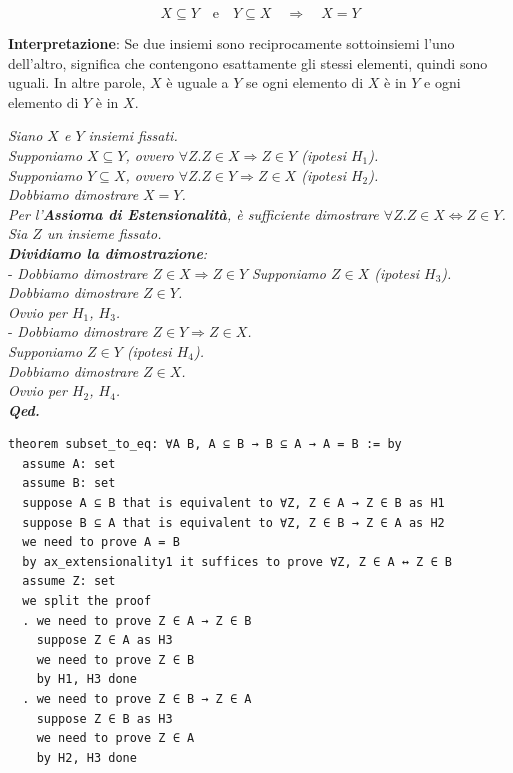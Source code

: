 \documentclass[
  a4paper,
]{article}
\begin{document}
\[
X \subseteq Y \quad \text{e} \quad Y \subseteq X \quad \Rightarrow \quad X = Y
\]

\textbf{Interpretazione}: Se due insiemi sono reciprocamente
sottoinsiemi l'uno dell'altro, significa che contengono esattamente gli
stessi elementi, quindi sono uguali. In altre parole, \(X\) è uguale a
\(Y\) se ogni elemento di \(X\) è in \(Y\) e ogni elemento di \(Y\) è in
\(X\).

\begin{examplebox}[Dimostrazione]

\emph{Siano \(X\) e \(Y\) insiemi fissati.}\\
\emph{Supponiamo \(X \subseteq Y\), ovvero
\(\forall Z.Z \in X \Rightarrow Z \in Y\) (ipotesi \(H_1\)).}\\
\emph{Supponiamo \(Y \subseteq X\), ovvero
\(\forall Z.Z \in Y \Rightarrow Z \in X\) (ipotesi \(H_2\)).}\\
\emph{Dobbiamo dimostrare \(X = Y\).}\\
\emph{Per l'\textbf{Assioma di Estensionalità}, è sufficiente dimostrare
\(\forall Z.Z \in X \iff Z \in Y\).}\\
\emph{Sia \(Z\) un insieme fissato.}\\
\emph{\textbf{Dividiamo la dimostrazione}:}\\
- \emph{Dobbiamo dimostrare \(Z \in X \Rightarrow Z \in Y\)}
\emph{Supponiamo \(Z \in X\) (ipotesi \(H_3\)).}\\
\emph{Dobbiamo dimostrare \(Z \in Y\).}\\
\emph{Ovvio per \(H_1\), \(H_3\).}\\
- \emph{Dobbiamo dimostrare \(Z \in Y \Rightarrow Z \in X\).}\\
\emph{Supponiamo \(Z \in Y\) (ipotesi \(H_4\)).}\\
\emph{Dobbiamo dimostrare \(Z \in X\).}\\
\emph{Ovvio per \(H_2\), \(H_4\).}\\
\textbf{\emph{Qed.}}

\end{examplebox}

\begin{examplebox}

\begin{lstlisting}
theorem subset_to_eq: ∀A B, A ⊆ B → B ⊆ A → A = B := by
  assume A: set
  assume B: set
  suppose A ⊆ B that is equivalent to ∀Z, Z ∈ A → Z ∈ B as H1
  suppose B ⊆ A that is equivalent to ∀Z, Z ∈ B → Z ∈ A as H2
  we need to prove A = B
  by ax_extensionality1 it suffices to prove ∀Z, Z ∈ A ↔ Z ∈ B
  assume Z: set
  we split the proof
  . we need to prove Z ∈ A → Z ∈ B
    suppose Z ∈ A as H3
    we need to prove Z ∈ B
    by H1, H3 done
  . we need to prove Z ∈ B → Z ∈ A
    suppose Z ∈ B as H3
    we need to prove Z ∈ A
    by H2, H3 done
\end{lstlisting}

\end{examplebox}
\end{document}
